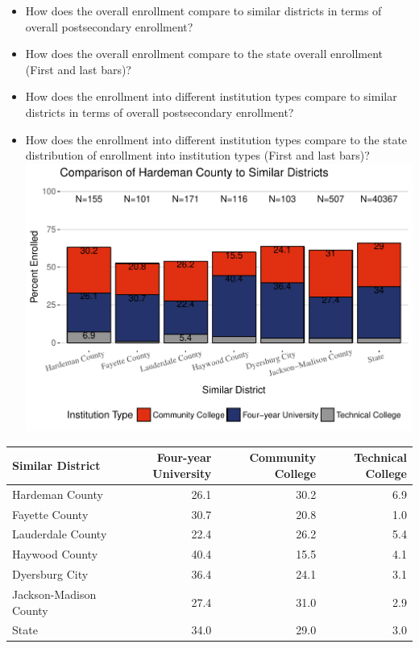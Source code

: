\documentclass[11pt,]{article}
\providecommand{\tightlist}{%
  \setlength{\itemsep}{0pt}\setlength{\parskip}{0pt}}
\begin{document}
\begin{itemize}
\tightlist
\item
  How does the overall enrollment compare to similar districts in terms
  of overall postsecondary enrollment?\\
\item
  How does the overall enrollment compare to the state overall
  enrollment (First and last bars)?\\
\item
  How does the enrollment into different institution types compare to
  similar districts in terms of overall postsecondary enrollment?\\
\item
  How does the enrollment into different institution types compare to
  the state distribution of enrollment into institution types (First and
  last bars)?\\
  \includegraphics{20170517_PSWRR_files/figure-latex/comparison_districts-1.pdf}
\end{itemize}

\begin{longtable}[]{@{}lrrr@{}}
\toprule
Similar District & Four-year University & Community College & Technical
College\tabularnewline
\midrule
\endhead
Hardeman County & 26.1 & 30.2 & 6.9\tabularnewline
Fayette County & 30.7 & 20.8 & 1.0\tabularnewline
Lauderdale County & 22.4 & 26.2 & 5.4\tabularnewline
Haywood County & 40.4 & 15.5 & 4.1\tabularnewline
Dyersburg City & 36.4 & 24.1 & 3.1\tabularnewline
Jackson-Madison County & 27.4 & 31.0 & 2.9\tabularnewline
State & 34.0 & 29.0 & 3.0\tabularnewline
\bottomrule
\end{longtable}
\end{document}
